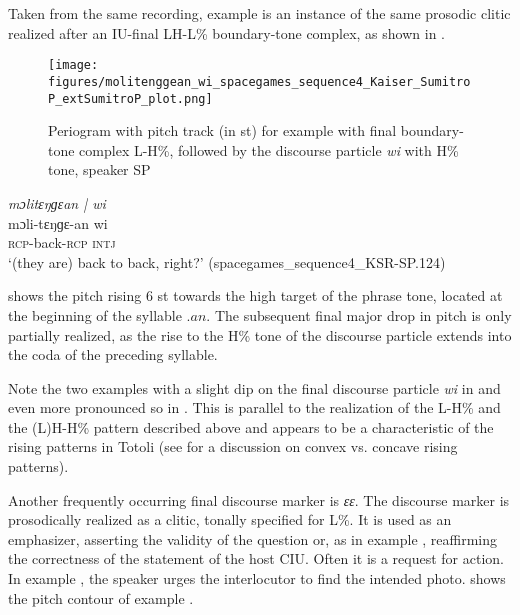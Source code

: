 

Taken from the same recording, example  is an instance of the same prosodic clitic realized after an IU-final LH-L\% boundary-tone complex, as shown in  .


\begin{figure}
	\texttt{[image: figures/molitenggean\_wi\_spacegames\_sequence4\_Kaiser\_SumitroP\_extSumitroP\_plot.png]}
	\caption{Periogram with pitch track (in st) for example  with final boundary-tone complex L-H\%, followed by the discourse particle \textit{wi} with H\% tone, speaker SP}
	\label{pitch:molitenggean wi}
\end{figure}

\ea
\label{ex:molitenggean wi}
\textit{mɔlitɛŋɡɛan | wi} \\
\gll mɔli-tɛŋɡɛ-an wi  \\
\textsc{rcp-}back\textsc{-rcp}  \textsc{intj}\\ 
\glt ‘(they are) back to back, right?’ \hfill(spacegames\_sequence4\_KSR-SP.124)
\z


 shows the pitch rising 6 st towards the high target of the phrase tone, located at the beginning of the syllable $.an$. The subsequent final major drop in pitch is only partially realized, as the rise to the H\% tone of the discourse particle extends into the coda of the preceding syllable.

Note the two examples with a slight dip on the final discourse particle \textit{wi} in    and even more pronounced so in  	. This is parallel to the realization of the L-H\% and the (L)H-H\% pattern described above and appears to be a characteristic of the rising patterns in Totoli (see  \cite{dombrowski2010shaping} for a discussion on convex vs. concave rising patterns).


Another frequently occurring final discourse marker is \textit{ɛɛ}. The discourse marker is prosodically realized as a clitic, tonally specified for L\%. It is used as an emphasizer, asserting the validity of the question or, as in example , reaffirming the correctness of the statement of the host CIU. Often it is a request for action. In example , the speaker urges the interlocutor to find the intended photo.   shows the pitch contour of example .







